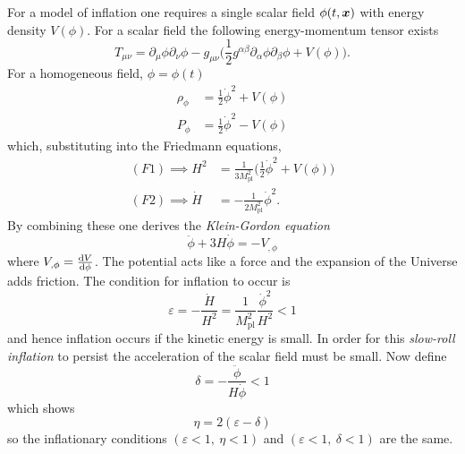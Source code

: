 \noindent
For a model of inflation one requires a single scalar field \(\phi(t,\vb*{x})\) with energy density \(V(\phi)\).
For a scalar field the following energy-momentum tensor exists
%
\begin{equation}
	T_{\mu\nu}
	= \partial_{\mu}\phi \partial_{\nu}\phi
	- g_{\mu\nu}\bigg( \frac{1}{2}g^{\alpha\beta} \partial_{\alpha}\phi \partial_{\beta}\phi + V(\phi) \bigg).
\end{equation}
%
For a homogeneous field, \ie{} \(\phi = \phi(t)\)
%
\begin{subequations}
	\begin{align}
		\rho_{\phi} & = \frac{1}{2}\dot{\phi}^{2} + V(\phi) \\
		P_{\phi}    & = \frac{1}{2}\dot{\phi}^{2} - V(\phi)
	\end{align}
\end{subequations}
%
which, substituting into the Friedmann equations,
%
\begin{subequations}
	\begin{align}
		(F1) \implies H^{2}   & = \frac{1}{3M_{\text{pl}}^{2}} \bigg(\frac{1}{2}\dot{\phi}^{2} + V(\phi) \bigg) \\
		(F2) \implies \dot{H} & = -\frac{1}{2M_{\text{pl}}^{2}} \dot{\phi}^{2}.
	\end{align}
\end{subequations}
%
By combining these one derives the \emph{Klein-Gordon equation}
%
\begin{equation}\label{eq:chapter2_KG}
	\ddot{\phi} + 3H\dot{\phi}
	= -V_{,\phi}
\end{equation}
%
where \(V_{,\phi} = \dv{V}{\phi}\).
The potential acts like a force and the expansion of the Universe adds friction.
The condition for inflation to occur is
%
\begin{equation}
	\varepsilon
	= -\frac{\dot{H}}{H^{2}}
	= \frac{1}{M_{\text{pl}}^{2}} \frac{\dot{\phi}^{2}}{H^{2}}
	< 1
\end{equation}
%
and hence inflation occurs if the kinetic energy is small.
In order for this \emph{slow-roll inflation} to persist the acceleration of the scalar field must be small.
Now define
%
\begin{equation}
	\delta
	= -\frac{\ddot{\phi}}{H\dot{\phi}}
	< 1
\end{equation}
%
which shows
%
\begin{equation}
	\eta
	= 2(\varepsilon - \delta)
\end{equation}
%
so the inflationary conditions \((\varepsilon<1,\ \eta<1)\) and \((\varepsilon<1,\ \delta<1)\) are the same.

